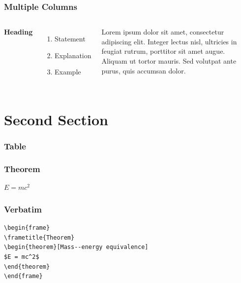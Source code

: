 \documentclass{beamer}
\begin{document}
\begin{frame}
\frametitle{Multiple Columns}
\begin{columns}[c] %

\textbf{Heading}
\begin{enumerate}
\item Statement
\item Explanation
\item Example
\end{enumerate}

Lorem ipsum dolor sit amet, consectetur adipiscing elit. Integer lectus nisl, ultricies in feugiat rutrum, porttitor sit amet augue. Aliquam ut tortor mauris. Sed volutpat ante purus, quis accumsan dolor.

\end{columns}
\end{frame}

\section{Second Section}

\begin{frame}
\frametitle{Table}
\end{frame}


\begin{frame}
\frametitle{Theorem}
\begin{theorem}
$E = mc^2$
\end{theorem}
\end{frame}


\begin{frame}[fragile] %
\frametitle{Verbatim}
\begin{example}
\begin{verbatim}
\begin{frame}
\frametitle{Theorem}
\begin{theorem}[Mass--energy equivalence]
$E = mc^2$
\end{theorem}
\end{frame}\end{verbatim}
\end{example}
\end{frame}
\end{document}

